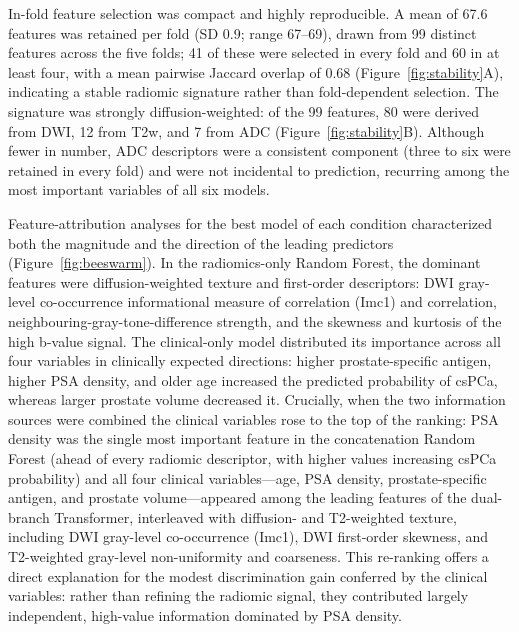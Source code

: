 \documentclass[11pt]{article}
\begin{document}
In-fold feature selection was compact and highly reproducible. A mean of 67.6
features was retained per fold (SD 0.9; range 67--69), drawn from 99 distinct
features across the five folds; 41 of these were selected in every fold and 60 in
at least four, with a mean pairwise Jaccard overlap of 0.68
(Figure~\ref{fig:stability}A), indicating a stable radiomic signature rather than
fold-dependent selection. The signature was strongly diffusion-weighted: of the
99 features, 80 were derived from DWI, 12 from T2w, and 7 from ADC
(Figure~\ref{fig:stability}B). Although fewer in number, ADC descriptors were a
consistent component (three to six were retained in every fold) and were not
incidental to prediction, recurring among the most important variables of all six
models.

Feature-attribution analyses for the best model of each condition characterized
both the magnitude and the direction of the leading predictors
(Figure~\ref{fig:beeswarm}). In the radiomics-only Random Forest, the dominant
features were diffusion-weighted texture and first-order descriptors: DWI
gray-level co-occurrence informational measure of correlation (Imc1) and
correlation, neighbouring-gray-tone-difference strength, and the skewness and
kurtosis of the high b-value signal. The clinical-only model distributed its
importance across all four variables in clinically expected directions: higher
prostate-specific antigen, higher PSA density, and older age increased the
predicted probability of csPCa, whereas larger prostate volume decreased it.
Crucially, when the two information sources were combined the clinical variables
rose to the top of the ranking: PSA density was the single most important feature
in the concatenation Random Forest (ahead of every radiomic descriptor, with
higher values increasing csPCa probability) and all four clinical
variables---age, PSA density, prostate-specific antigen, and prostate
volume---appeared among the leading features of the dual-branch Transformer,
interleaved with diffusion- and T2-weighted texture, including DWI gray-level
co-occurrence (Imc1), DWI first-order skewness, and T2-weighted gray-level
non-uniformity and coarseness. This re-ranking offers a direct explanation for the modest
discrimination gain conferred by the clinical variables: rather than refining the
radiomic signal, they contributed largely independent, high-value information
dominated by PSA density.
\end{document}
